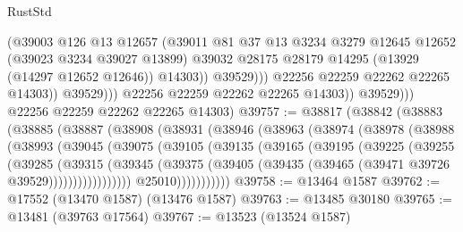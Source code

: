\begin{lexlean}{RustStd}
\begin{coremodule}
                                (@39003
                                  @126
                                  @13
                                  @12657
                                  (@39011
                                    @81
                                    @37
                                    @13
                                    @3234
                                    @3279
                                    @12645
                                    @12652
                                    (@39023 @3234 @39027 @13899)
                                    @39032
                                    @28175
                                    @28179
                                    @14295
                                    (@13929 (@14297 @12652 @12646))
                                    @14303))
                                @39529)))
                          @22256
                          @22259
                          @22262
                          @22265
                          @14303))
                      @39529)))
                @22256
                @22259
                @22262
                @22265
                @14303))
            @39529)))
      @22256
      @22259
      @22262
      @22265
      @14303)
@39757 := @38817
    (@38842
      (@38883
        (@38885
          (@38887
            (@38908
              (@38931
                (@38946
                  (@38963
                    (@38974
                      (@38978
                        (@38988
                          (@38993
                            (@39045
                              (@39075
                                (@39105
                                  (@39135
                                    (@39165
                                      (@39195
                                        (@39225
                                          (@39255
                                            (@39285
                                              (@39315
                                                (@39345
                                                  (@39375
                                                    (@39405
                                                      (@39435
                                                        (@39465
                                                          (@39471 @39726 @39529)))))))))))))))))
                          @25010)))))))))))
@39758 := @13464 @1587
@39762 := @17552 (@13470 @1587) (@13476 @1587)
@39763 := @13485 @30180
@39765 := @13481 (@39763 @17564)
@39767 := @13523 (@13524 @1587)

\end{coremodule}
\end{lexlean}

